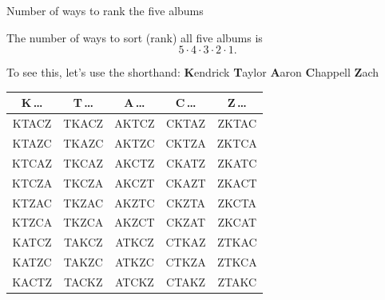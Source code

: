 \documentclass[10pt]{beamer}
\begin{document}
\begin{frame}{Number of ways to rank the five albums}

\footnotesize The number of ways to sort (rank) all five albums is
\[ 5 \cdot 4 \cdot 3 \cdot 2 \cdot 1. \]

To see this, let's use the shorthand:
\textbf{K}endrick \quad \textbf{T}aylor \quad \textbf{A}aron \quad \textbf{C}happell \quad \textbf{Z}ach

\begin{center}

\tiny\ttfamily
\setlength{\tabcolsep}{16pt}\renewcommand{\arraystretch}{0.95}
\begin{tabular}{ccccc}
\textbf{\color{blue!70!black}K\,\ldots} & \textbf{\color{orange!80!black}T\,\ldots} & \textbf{\color{green!45!black}A\,\ldots} & \textbf{\color{red!70!black}C\,\ldots} & \textbf{\color{purple!70!black}Z\,\ldots} \\[1pt]
\hline
{\color{blue!70!black}KTACZ} & {\color{orange!80!black}TKACZ} & {\color{green!45!black}AKTCZ} & {\color{red!70!black}CKTAZ} & {\color{purple!70!black}ZKTAC} \\
{\color{blue!70!black}KTAZC} & {\color{orange!80!black}TKAZC} & {\color{green!45!black}AKTZC} & {\color{red!70!black}CKTZA} & {\color{purple!70!black}ZKTCA} \\
{\color{blue!70!black}KTCAZ} & {\color{orange!80!black}TKCAZ} & {\color{green!45!black}AKCTZ} & {\color{red!70!black}CKATZ} & {\color{purple!70!black}ZKATC} \\
{\color{blue!70!black}KTCZA} & {\color{orange!80!black}TKCZA} & {\color{green!45!black}AKCZT} & {\color{red!70!black}CKAZT} & {\color{purple!70!black}ZKACT} \\
{\color{blue!70!black}KTZAC} & {\color{orange!80!black}TKZAC} & {\color{green!45!black}AKZTC} & {\color{red!70!black}CKZTA} & {\color{purple!70!black}ZKCTA} \\
{\color{blue!70!black}KTZCA} & {\color{orange!80!black}TKZCA} & {\color{green!45!black}AKZCT} & {\color{red!70!black}CKZAT} & {\color{purple!70!black}ZKCAT} \\
{\color{blue!70!black}KATCZ} & {\color{orange!80!black}TAKCZ} & {\color{green!45!black}ATKCZ} & {\color{red!70!black}CTKAZ} & {\color{purple!70!black}ZTKAC} \\
{\color{blue!70!black}KATZC} & {\color{orange!80!black}TAKZC} & {\color{green!45!black}ATKZC} & {\color{red!70!black}CTKZA} & {\color{purple!70!black}ZTKCA} \\
{\color{blue!70!black}KACTZ} & {\color{orange!80!black}TACKZ} & {\color{green!45!black}ATCKZ} & {\color{red!70!black}CTAKZ} & {\color{purple!70!black}ZTAKC} \\

\end{tabular}
\end{center}
\end{frame}
\end{document}
